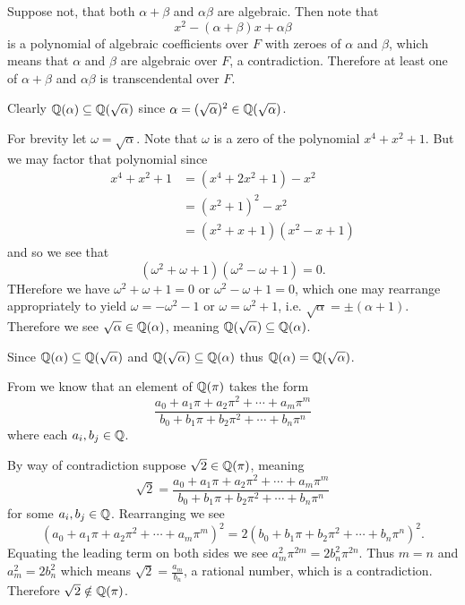 \begin{questions}
\begin{partquestions}{\roman*}
        \item Suppose not, that both $\alpha + \beta$ and $\alpha\beta$ are algebraic. Then note that
        \[
            x^2 - (\alpha+\beta)x + \alpha\beta
        \]
        is a polynomial of algebraic coefficients over $F$ with zeroes of $\alpha$ and $\beta$, which means that $\alpha$ and $\beta$ are algebraic over $F$, a contradiction. Therefore at least one of $\alpha + \beta$ and $\alpha\beta$ is transcendental over $F$.
    \end{partquestions}

    \item Clearly $\mathbb{Q}(\alpha) \subseteq \mathbb{Q}(\sqrt\alpha)$ since $\alpha = (\sqrt\alpha)^2 \in \mathbb{Q}(\sqrt\alpha)$.

    For brevity let $\omega = \sqrt\alpha$. Note that $\omega$ is a zero of the polynomial $x^4+x^2+1$. But we may factor that polynomial since
    \begin{align*}
        x^4 + x^2 + 1 &= (x^4 + 2x^2 + 1) - x^2\\
        &= (x^2+1)^2 - x^2\\
        &= (x^2+x+1)(x^2-x+1)
    \end{align*}
    and so we see that
    \[
        (\omega^2+\omega+1)(\omega^2-\omega+1) = 0.
    \]
    THerefore we have $\omega^2+\omega+1 = 0$ or $\omega^2-\omega+1 = 0$, which one may rearrange appropriately to yield $\omega = -\omega^2-1$ or $\omega = \omega^2 + 1$, i.e. $\sqrt\alpha = \pm(\alpha+1)$. Therefore we see $\sqrt\alpha \in \mathbb{Q}(\alpha)$, meaning $\mathbb{Q}(\sqrt\alpha) \subseteq \mathbb{Q}(\alpha)$.

    Since $\mathbb{Q}(\alpha) \subseteq \mathbb{Q}(\sqrt\alpha)$ and $\mathbb{Q}(\sqrt\alpha) \subseteq \mathbb{Q}(\alpha)$ thus $\mathbb{Q}(\alpha) = \mathbb{Q}(\sqrt\alpha)$.

    \item From  we know that an element of $\mathbb{Q}(\pi)$ takes the form
    \[
        \frac{a_0 + a_1\pi + a_2\pi^2 + \cdots + a_m\pi^m}{b_0 + b_1\pi + b_2\pi^2 + \cdots + b_n\pi^n}
    \]
    where each $a_i, b_j \in \mathbb{Q}$.

    By way of contradiction suppose $\sqrt2 \in \mathbb{Q}(\pi)$, meaning
    \[
        \sqrt2 = \frac{a_0 + a_1\pi + a_2\pi^2 + \cdots + a_m\pi^m}{b_0 + b_1\pi + b_2\pi^2 + \cdots + b_n\pi^n}
    \]
    for some $a_i, b_j \in \mathbb{Q}$. Rearranging we see
    \[
        \left(a_0 + a_1\pi + a_2\pi^2 + \cdots + a_m\pi^m\right)^2 = 2\left(b_0 + b_1\pi + b_2\pi^2 + \cdots + b_n\pi^n\right)^2.
    \]
    Equating the leading term on both sides we see $a_m^2\pi^{2m} = 2b_n^2\pi^{2n}$. Thus $m = n$ and $a_m^2 = 2b_n^2$ which means $\sqrt2 = \frac{a_m}{b_n}$, a rational number, which is a contradiction. Therefore $\sqrt2 \notin \mathbb{Q}(\pi)$.


\end{questions}
